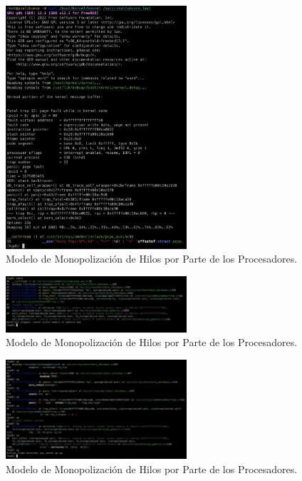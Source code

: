 \begin{figure}[H]
    \centering
    \includegraphics[width=0.6\textwidth]{images/kgdb_init.jpeg}
    \caption{Modelo de Monopolización de Hilos por Parte de los Procesadores.}
    \label{fig:kgdb_init}
\end{figure}

\vspace{.50cm}
\begin{figure}[H]
    \centering
    \includegraphics[width=0.6\textwidth]{images/kgdb_where.jpeg}
    \caption{Modelo de Monopolización de Hilos por Parte de los Procesadores.}
    \label{fig:kgdb_where}
\end{figure}

\vspace{.50cm}
\begin{figure}[H]
    \centering
    \includegraphics[width=0.6\textwidth]{images/kgdb_kern-select.jpeg}
    \caption{Modelo de Monopolización de Hilos por Parte de los Procesadores.}
    \label{fig:kgdb_kern-select}
\end{figure}

